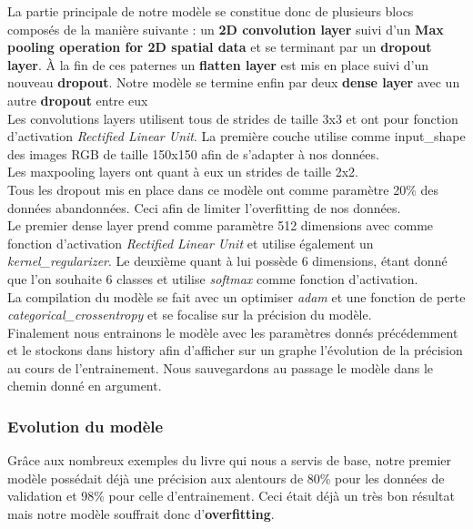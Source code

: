\documentclass[12pt ,a4paper ]{article}
\begin{document}
\begin{multicols}{2}
La partie principale de notre modèle se constitue donc de plusieurs blocs composés de la manière suivante : un \textbf{2D convolution layer}  suivi d'un \textbf{Max pooling operation for 2D spatial data} et se terminant par un \textbf{dropout layer}. À la fin de ces paternes un \textbf{flatten layer} est mis en place suivi d'un nouveau \textbf{dropout}. Notre modèle se termine enfin par deux \textbf{dense layer} avec un autre \textbf{dropout} entre eux \\ 

Les convolutions layers utilisent tous de strides de taille 3x3 et ont pour fonction d'activation \textit{Rectified Linear Unit}. La première couche utilise comme input\_shape des images RGB de taille 150x150 afin de s'adapter à nos données.\\
Les maxpooling layers ont quant à eux un strides de taille 2x2.\\
Tous les dropout mis en place dans ce modèle ont comme paramètre 20\% des données abandonnées. Ceci afin de limiter l'overfitting de nos données. \\
Le premier dense layer prend comme paramètre 512 dimensions avec comme fonction d'activation \textit{Rectified Linear Unit} et utilise également un \textit{kernel\_regularizer}. Le deuxième quant à lui possède 6 dimensions, étant donné que l'on souhaite 6 classes et utilise \textit{softmax} comme fonction d'activation. \\

La compilation du modèle se fait avec un optimiser \textit{adam} et une fonction de perte \textit{categorical\_crossentropy} et se focalise sur la précision du modèle. \\

Finalement nous entrainons le modèle avec les paramètres donnés précédemment et le stockons dans history afin d'afficher sur un graphe l'évolution de la précision au cours de l'entrainement. Nous sauvegardons au passage le modèle dans le chemin donné en argument. 

\subsubsection{Evolution du modèle}
Grâce aux nombreux exemples du livre qui nous a servis de base, notre premier modèle possédait déjà une précision aux alentours de 80\% pour les données de validation et 98\% pour celle d'entrainement. Ceci était déjà un très bon résultat mais notre modèle souffrait donc d'\textbf{overfitting}.\\


\end{multicols}
\end{document}
